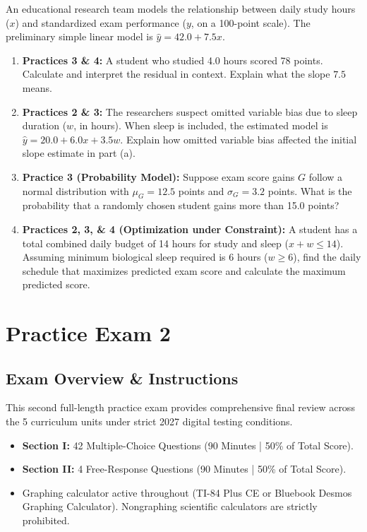 \begin{workbookbox}
An educational research team models the relationship between daily study hours ($x$) and standardized exam performance ($y$, on a 100-point scale). The preliminary simple linear model is $\hat{y} = 42.0 + 7.5x$.
\begin{enumerate}[label=(\alph*)]
  \item \textbf{Practices 3 \& 4:} A student who studied 4.0 hours scored 78 points. Calculate and interpret the residual in context. Explain what the slope $7.5$ means.
  \item \textbf{Practices 2 \& 3:} The researchers suspect omitted variable bias due to sleep duration ($w$, in hours). When sleep is included, the estimated model is $\hat{y} = 20.0 + 6.0x + 3.5w$. Explain how omitted variable bias affected the initial slope estimate in part (a).
  \item \textbf{Practice 3 (Probability Model):} Suppose exam score gains $G$ follow a normal distribution with $\mu_G = 12.5$ points and $\sigma_G = 3.2$ points. What is the probability that a randomly chosen student gains more than 15.0 points?
  \item \textbf{Practices 2, 3, \& 4 (Optimization under Constraint):} A student has a total combined daily budget of 14 hours for study and sleep ($x + w \le 14$). Assuming minimum biological sleep required is 6 hours ($w \ge 6$), find the daily schedule that maximizes predicted exam score and calculate the maximum predicted score.
\end{enumerate}
\end{workbookbox}

\chapter{Practice Exam 2}

\section*{Exam Overview \& Instructions}
This second full-length practice exam provides comprehensive final review across the 5 curriculum units under strict 2027 digital testing conditions.
\begin{itemize}[leftmargin=1.2em]
  \item \textbf{Section I:} 42 Multiple-Choice Questions (90 Minutes | 50\% of Total Score).
  \item \textbf{Section II:} 4 Free-Response Questions (90 Minutes | 50\% of Total Score).
  \item Graphing calculator active throughout (TI-84 Plus CE or Bluebook Desmos Graphing Calculator). Nongraphing scientific calculators are strictly prohibited.
\end{itemize}

